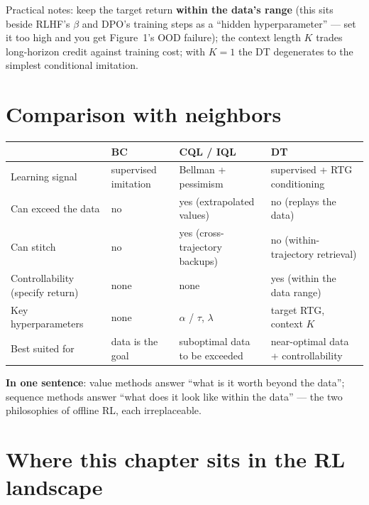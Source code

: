 \documentclass{article}
\begin{document}
Practical notes: keep the target return \textbf{within the data's range} (this sits beside RLHF's $\beta$ and DPO's training steps as a ``hidden hyperparameter'' --- set it too high and you get Figure~1's OOD failure); the context length $K$ trades long-horizon credit against training cost; with $K=1$ the DT degenerates to the simplest conditional imitation.

\section*{Comparison with neighbors}

\begin{center}
\small
\setlength{\tabcolsep}{3pt}
\begin{tabular}{>{\raggedright\arraybackslash}p{}|>{\raggedright\arraybackslash}p{}|>{\raggedright\arraybackslash}p{}|>{\raggedright\arraybackslash}p{}}
 & \textbf{BC} & \textbf{CQL / IQL} & \textbf{DT} \\
\hline
Learning signal & supervised imitation & Bellman + pessimism & supervised + RTG conditioning \\
Can exceed the data & no & yes (extrapolated values) & no (replays the data) \\
Can stitch & no & yes (cross-trajectory backups) & no (within-trajectory retrieval) \\
Controllability (specify return) & none & none & yes (within the data range) \\
Key hyperparameters & none & $\alpha$ / $\tau$, $\lambda$ & target RTG, context $K$ \\
Best suited for & data is the goal & suboptimal data to be exceeded & near-optimal data + controllability \\
\end{tabular}
\end{center}

\textbf{In one sentence}: value methods answer ``what is it worth beyond the data''; sequence methods answer ``what does it look like within the data'' --- the two philosophies of offline RL, each irreplaceable.

\section*{Where this chapter sits in the RL landscape}
\end{document}
